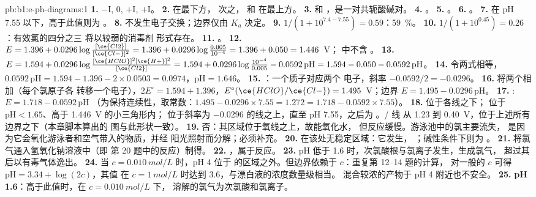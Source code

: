 \begin{solution}{pb:b1:e-ph-diagrams:1}
\textbf{1.} $-$I, 0, $+$I, $+$I。
\textbf{2.}  在最下方， 次之，
 和  在最上方。
\textbf{3.}  和 ，是一对共轭酸碱对。
\textbf{4.} 。
\textbf{5.} 。
\textbf{6.} 。
\textbf{7.}  在 pH 7.55 以下，高于此值则为 。
\textbf{8.} 不发生电子交换；边界仅由 $K_a$ 决定。
\textbf{9.} $1/(1 + 10^{7.4 - 7.55}) = 0.59$：\qty{59}{\percent}。
\textbf{10.} $1/(1 + 10^{0.45}) = 0.26$：有效氯的四分之三
将以较弱的消毒剂  形式存在。
\textbf{11.} 。
\textbf{12.} $E = 1.396 + 0.0296\log\frac{[\ce{Cl2}]}{[\ce{Cl-}]^2} = 1.396
+ 0.0296\log\frac{0.005}{10^{-4}} = 1.396 + 0.050 = 1.446$~V；
中不含 。
\textbf{13.} $E = 1.594 + 0.0296\log\frac{[\ce{HClO}]^2[\ce{H+}]^2}{[\ce{Cl2}]}
= 1.594 + 0.0296\log\frac{10^{-4}}{0.005} - 0.0592\,\mathrm{pH} = 1.594 -
0.050 - 0.0592\,\mathrm{pH}$。
\textbf{14.} 令两式相等，$0.0592\,\mathrm{pH} = 1.594 - 1.396 - 2 \times 0.0503
= 0.0974$，$\mathrm{pH} = 1.646$。
\textbf{15.} ：一个质子对应两个
电子，斜率 $-0.0592/2 = -0.0296$。
\textbf{16.} 将两个相加（每个氯原子各
转移一个电子），$2E^\circ = 1.594 + 1.396$，$E^\circ(\ce{HClO}/\ce{Cl-}) =
1.495$~V；边界 $E = 1.495 - 0.0296\,\mathrm{pH}$。
\textbf{17.} : $E = 1.718 - 0.0592\,\mathrm{pH}$
（为保持连续性，取常数：$1.495 - 0.0296 \times 7.55 = 1.272 = 1.718
- 0.0592 \times 7.55$）。
\textbf{18.}  位于各线之下； 位于
$\mathrm{pH} < 1.65$、高于 1.446~V 的小三角形内； 位于斜率为
$-0.0296$ 的线之上，直至 pH 7.55，之后为 。/ 线
从 1.23 到 0.40~V，位于上述所有边界之下（本章脚本算出的
图与此形状一致）。
\textbf{19.} 否：其区域位于氧线之上，故能氧化水，
但反应缓慢。游泳池中的氯主要流失，
是因为它会氧化游泳者和空气带入的物质，并经
阳光照射而分解；必须补充。
\textbf{20.}  在该处无稳定区域：它发生，
；碱性条件下则为
。
\textbf{21.} 将氯气通入氢氧化钠溶液中（即
第 20 题中的反应）制得。
\textbf{22.} ，属于反应。
\textbf{23.} pH 低于 1.6 时，次氯酸根与氯离子发生，生成氯气，
超过其后以有毒气体逸出。
\textbf{24.} 当 $c = \qty{0.010}{mol/L}$ 时，pH 4 位于
 的区域之外。但边界依赖于 $c$：重复第 12--14 题的计算，
对一般的 $c$ 可得 $\mathrm{pH} = 3.34 + \log(2c)$，其值
在 $c = \qty{1}{mol/L}$ 时达到 3.6，与漂白液的浓度数量级相当。
混合较浓的产物于 pH 4 附近也不安全。
\textbf{25.} \textbf{pH 1.6}：高于此值时，在 $c = \qty{0.010}{mol/L}$ 下，
溶解的氯气为次氯酸和氯离子。
\end{solution}

